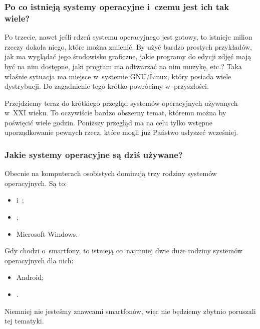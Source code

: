 \documentclass[10pt,t]{beamer}
\begin{document}
\begin{frame}
  \frametitle{Po co istnieją systemy operacyjne i~czemu jest ich
    tak wiele?}


  Po trzecie, nawet jeśli rdzeń systemu operacyjnego jest gotowy, to
  istnieje milion rzeczy dokoła niego, które można zmienić. By użyć bardzo
  prostych przykładów, jak ma wyglądać jego środowisko graficzne,
  jakie programy do edycji zdjęć mają być na nim dostępne, jaki program
  ma odtwarzać na nim muzykę, etc.? Taka właśnie sytuacja ma miejsce
  w~systemie GNU/Linux, który posiada wiele dystrybucji. Do zagadnienie
  tego krótko powrócimy w~przyszłości.

  Przejdziemy teraz do krótkiego przegląd systemów operacyjnych używanych
  w~XXI wieku. To oczywiście bardzo obszerny temat, któremu można by
  poświęcić wiele godzin. Poniższy przegląd ma na celu tylko wstępne
  uporządkowanie pewnych rzecz, które mogli już Państwo usłyszeć wcześniej.

\end{frame}





\begin{frame}
  \frametitle{Jakie systemy operacyjne są dziś używane?}


  Obecnie na komputerach osobistych dominują trzy rodziny systemów
  operacyjnych. Są to:
  \begin{itemize}

  \item {}
    i~;

  \item {};

  \item {}
    {Microsoft Windows}.

  \end{itemize}

  Gdy chodzi o~smartfony, to istnieją co~najmniej dwie duże rodziny systemów
  operacyjnych dla nich:
  \begin{itemize}

  \item
    {Android};

  \item {}.

  \end{itemize}
  Niemniej nie jesteśmy znawcami smartfonów, więc nie będziemy zbytnio
  poruszali tej tematyki.


\end{frame}
\end{document}
